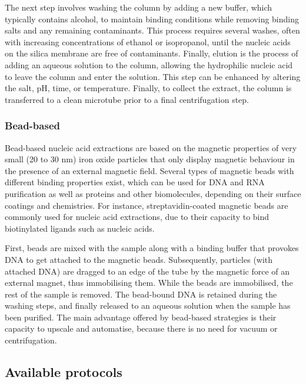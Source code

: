 \documentclass[
]{book}
\begin{document}
The next step involves washing the column by adding a new buffer, which typically contains alcohol, to maintain binding conditions while removing binding salts and any remaining contaminants. This process requires several washes, often with increasing concentrations of ethanol or isopropanol, until the nucleic acids on the silica membrane are free of contaminants. Finally, elution is the process of adding an aqueous solution to the column, allowing the hydrophilic nucleic acid to leave the column and enter the solution. This step can be enhanced by altering the salt, pH, time, or temperature. Finally, to collect the extract, the column is transferred to a clean microtube prior to a final centrifugation step.

\hypertarget{bead-based}{%
\subsubsection*{Bead-based}\label{bead-based}}

Bead-based nucleic acid extractions are based on the magnetic properties of very small (20 to 30 nm) iron oxide particles that only display magnetic behaviour in the presence of an external magnetic field. Several types of magnetic beads with different binding properties exist, which can be used for DNA and RNA purification as well as proteins and other biomolecules, depending on their surface coatings and chemistries. For instance, streptavidin-coated magnetic beads are commonly used for nucleic acid extractions, due to their capacity to bind biotinylated ligands such as nucleic acids.

First, beads are mixed with the sample along with a binding buffer that provokes DNA to get attached to the magnetic beads. Subsequently, particles (with attached DNA) are dragged to an edge of the tube by the magnetic force of an external magnet, thus immobilising them. While the beads are immobilised, the rest of the sample is removed. The bead-bound DNA is retained during the washing steps, and finally released to an aqueous solution when the sample has been purified. The main advantage offered by bead-based strategies is their capacity to upscale and automatise, because there is no need for vacuum or centrifugation.

\hypertarget{available-protocols}{%
\subsection*{Available protocols}\label{available-protocols}}
\end{document}
